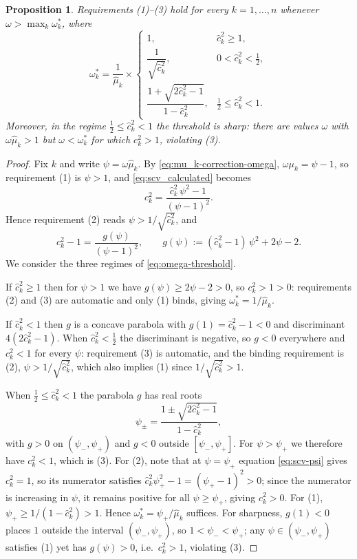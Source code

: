\documentclass{article}
\newtheorem{proposition}{Proposition}
\begin{document}
\begin{proposition}
\label{prop:init-omega}
Requirements (1)--(3) hold for every $k = 1,\ldots,n$ whenever $\omega > \max_{k} \omega^*_k$, where
\begin{equation}
\label{eq:omega-threshold}
\omega^*_k
=
\frac{1}{\hat{\mu}_k}
\times
\begin{cases}
1, & \hat{c}_k^2 \ge 1,\\[1ex]
\dfrac{1}{\sqrt{\hat{c}_k^2}}, & 0 < \hat{c}_k^2 < \tfrac12,\\[2ex]
\dfrac{1+\sqrt{2\hat{c}_k^2-1}}{1-\hat{c}_k^2}, & \tfrac12 \le \hat{c}_k^2 < 1.
\end{cases}
\end{equation}
Moreover, in the regime $\tfrac12 \le \hat{c}_k^2 < 1$ the threshold is sharp: there are values $\omega$ with $\omega\hat{\mu}_k > 1$ but $\omega < \omega^*_k$ for which $c_k^2 > 1$, violating (3).
\end{proposition}
\begin{proof}
Fix $k$ and write $\psi = \omega\hat{\mu}_k$. By \eqref{eq:mu_k-correction-omega}, $\omega\mu_k = \psi - 1$, so requirement (1) is $\psi > 1$, and \eqref{eq:scv_calculated} becomes
\begin{equation}
\label{eq:scv-psi}
c_k^2 = \frac{\hat{c}_k^2\,\psi^2 - 1}{(\psi-1)^2}.
\end{equation}
Hence requirement (2) reads $\psi > 1/\sqrt{\hat{c}_k^2}$, and
\[
c_k^2 - 1 = \frac{g(\psi)}{(\psi-1)^2},
\qquad
g(\psi) := (\hat{c}_k^2-1)\,\psi^2 + 2\psi - 2 .
\]
We consider the three regimes of \eqref{eq:omega-threshold}.

If $\hat{c}_k^2 \ge 1$ then for $\psi > 1$ we have $g(\psi) \ge 2\psi - 2 > 0$, so $c_k^2 > 1 > 0$: requirements (2) and (3) are automatic and only (1) binds, giving $\omega^*_k = 1/\hat{\mu}_k$.

If $\hat{c}_k^2 < 1$ then $g$ is a concave parabola with $g(1) = \hat{c}_k^2 - 1 < 0$ and discriminant $4(2\hat{c}_k^2-1)$. When $\hat{c}_k^2 < \tfrac12$ the discriminant is negative, so $g < 0$ everywhere and $c_k^2 < 1$ for every $\psi$: requirement (3) is automatic, and the binding requirement is (2), $\psi > 1/\sqrt{\hat{c}_k^2}$, which also implies (1) since $1/\sqrt{\hat{c}_k^2} > 1$.

When $\tfrac12 \le \hat{c}_k^2 < 1$ the parabola $g$ has real roots
\[
\psi_\pm = \frac{1 \pm \sqrt{2\hat{c}_k^2-1}}{1-\hat{c}_k^2},
\]
with $g > 0$ on $(\psi_-,\psi_+)$ and $g < 0$ outside $[\psi_-,\psi_+]$. For $\psi > \psi_+$ we therefore have $c_k^2 < 1$, which is (3). For (2), note that at $\psi = \psi_+$ equation \eqref{eq:scv-psi} gives $c_k^2 = 1$, so its numerator satisfies $\hat{c}_k^2\psi_+^2 - 1 = (\psi_+-1)^2 > 0$; since the numerator is increasing in $\psi$, it remains positive for all $\psi \ge \psi_+$, giving $c_k^2 > 0$. For (1), $\psi_+ \ge 1/(1-\hat{c}_k^2) > 1$. Hence $\omega^*_k = \psi_+/\hat{\mu}_k$ suffices. For sharpness, $g(1) < 0$ places $1$ outside the interval $(\psi_-,\psi_+)$, so $1 < \psi_- < \psi_+$; any $\psi \in (\psi_-,\psi_+)$ satisfies (1) yet has $g(\psi) > 0$, i.e.\ $c_k^2 > 1$, violating (3).
\end{proof}
\end{document}
